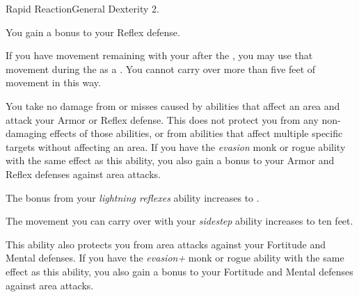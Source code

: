   \begin{feat}{Rapid Reaction}{General}
    \featpre Dexterity 2.

     You gain a  bonus to your Reflex defense.

     If you have movement remaining with your  after the , you may use that movement during the  as a .
    You cannot carry over more than five feet of movement in this way.

     You take no damage from  or misses caused by abilities that affect an area and attack your Armor or Reflex defense.
    This does not protect you from any non-damaging effects of those abilities, or from abilities that affect multiple specific targets without affecting an area.
    If you have the \textit{evasion} monk or rogue ability with the same effect as this ability, you also gain a  bonus to your Armor and Reflex defenses against area attacks.

     The bonus from your \textit{lightning reflexes} ability increases to .

     The movement you can carry over with your \textit{sidestep} ability increases to ten feet.

     This ability also protects you from area attacks against your Fortitude and Mental defenses.
    If you have the \textit{evasion+} monk or rogue ability with the same effect as this ability, you also gain a  bonus to your Fortitude and Mental defenses against area attacks.
  \end{feat}

